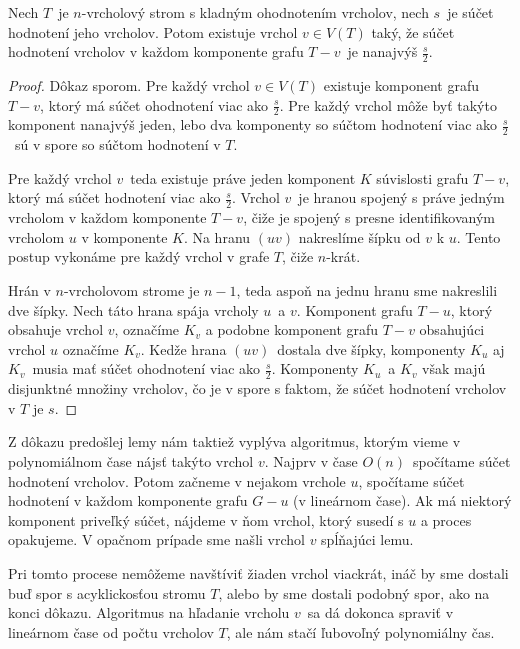 \begin{lema}
    \label{stromsep-lema}
    Nech $T$ je $n$-vrcholový strom s kladným ohodnotením vrcholov, nech $s$ je súčet hodnotení jeho vrcholov.
    Potom existuje vrchol $v \in V(T)$ taký, že súčet hodnotení vrcholov v každom komponente
    grafu $T - v$ je nanajvýš $\frac{s}{2}$.
\end{lema}
\begin{proof}
    Dôkaz sporom. Pre každý vrchol $v \in V(T)$ existuje komponent grafu $T - v$, ktorý
    má súčet ohodnotení viac ako $\frac{s}{2}$. Pre každý vrchol môže byť takýto komponent nanajvýš
    jeden, lebo dva komponenty so súčtom hodnotení viac ako $\frac{s}{2}$ sú v spore so súčtom
    hodnotení v $T$.

    Pre každý vrchol $v$ teda existuje práve jeden komponent $K$ súvislosti grafu
    $T - v$, ktorý má súčet hodnotení viac ako $\frac{s}{2}$. Vrchol $v$ je hranou spojený
    s práve jedným vrcholom v každom komponente $T - v$, čiže je spojený s presne identifikovaným
    vrcholom $u$ v komponente $K$. Na hranu $(uv)$ nakreslíme šípku od $v$ k $u$. Tento postup
    vykonáme pre každý vrchol v grafe $T$, čiže $n$-krát.

    Hrán v $n$-vrcholovom strome je $n-1$, teda aspoň na jednu hranu sme nakreslili dve šípky.
    Nech táto hrana spája vrcholy $u$ a $v$. Komponent grafu $T - u$, ktorý obsahuje vrchol $v$,
    označíme $K_v$ a podobne komponent grafu $T - v$ obsahujúci vrchol $u$ označíme $K_v$. Kedže
    hrana $(uv)$ dostala dve šípky, komponenty $K_u$ aj $K_v$ musia mať súčet ohodnotení viac ako
    $\frac{s}{2}$. Komponenty $K_u$ a $K_v$ však majú disjunktné množiny vrcholov, čo je v spore
    s faktom, že súčet hodnotení vrcholov v $T$ je $s$. \qedhere
\end{proof}

Z dôkazu predošlej lemy nám taktiež vyplýva algoritmus, ktorým vieme v polynomiálnom čase
nájsť takýto vrchol $v$. Najprv v čase $O(n)$ spočítame súčet hodnotení vrcholov. Potom začneme
v nejakom vrchole $u$, spočítame súčet hodnotení v každom komponente grafu $G - u$ (v lineárnom čase).
Ak má niektorý komponent priveľký súčet, nájdeme v ňom vrchol, ktorý susedí s $u$ a proces opakujeme.
V opačnom prípade sme našli vrchol $v$ spĺňajúci lemu.

Pri tomto procese nemôžeme navštíviť žiaden vrchol viackrát, ináč by sme dostali buď spor s
acyklickosťou stromu $T$, alebo by sme dostali podobný spor, ako na konci dôkazu. Algoritmus
na hľadanie vrcholu $v$ sa dá dokonca spraviť v lineárnom čase od počtu vrcholov $T$, ale nám
stačí ľubovoľný polynomiálny čas.

